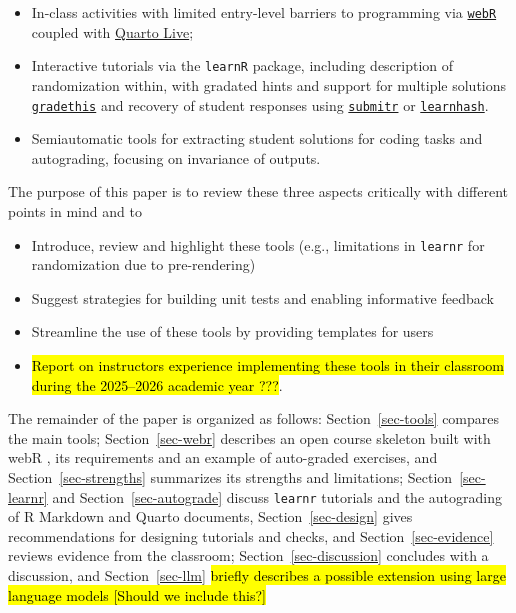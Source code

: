 \documentclass[
  12pt]{article}
\providecommand{\tightlist}{%
  \setlength{\itemsep}{0pt}\setlength{\parskip}{0pt}}
\begin{document}
\begin{itemize}
\tightlist
\item
  In-class activities with limited entry-level barriers to programming
  via \href{https://docs.r-wasm.org/webr/latest/}{\texttt{webR}} coupled
  with \href{https://r-wasm.github.io/quarto-live/}{Quarto Live};
\item
  Interactive tutorials via the \texttt{learnR}
  \citep{learnr, Stoudt.Scotina.Luebke:2022} package, including
  description of randomization within, with gradated hints and support
  for multiple solutions
  \href{https://pkgs.rstudio.com/gradethis/}{\texttt{gradethis}} and
  recovery of student responses using
  \href{https://dtkaplan.github.io/submitr/articles/using.html}{\texttt{submitr}}
  or \href{https://github.com/rundel/learnrhash}{\texttt{learnhash}}.
\item
  Semiautomatic tools for extracting student solutions for coding tasks
  and autograding, focusing on invariance of outputs.
\end{itemize}

The purpose of this paper is to review these three aspects critically
with different points in mind and to

\begin{itemize}
\tightlist
\item
  Introduce, review and highlight these tools (e.g., limitations in
  \texttt{learnr} for randomization due to pre-rendering)
\item
  Suggest strategies for building unit tests and enabling informative
  feedback
\item
  Streamline the use of these tools by providing templates for users
\item
  \hl{Report on instructors experience implementing these tools in their classroom during the 2025--2026 academic year ???}.
\end{itemize}

The remainder of the paper is organized as follows:
Section~\ref{sec-tools} compares the main tools; Section~\ref{sec-webr}
describes an open course skeleton built with webR \citep{cancotsrepo},
its requirements and an example of auto-graded exercises, and
Section~\ref{sec-strengths} summarizes its strengths and limitations;
Section~\ref{sec-learnr} and Section~\ref{sec-autograde} discuss
\texttt{learnr} tutorials and the autograding of R Markdown and Quarto
documents, Section~\ref{sec-design} gives recommendations for designing
tutorials and checks, and Section~\ref{sec-evidence} reviews evidence
from the classroom; Section~\ref{sec-discussion} concludes with a
discussion, and Section~\ref{sec-llm}
\hl{briefly describes a possible extension using large language models [Should we include this?]}
\end{document}

